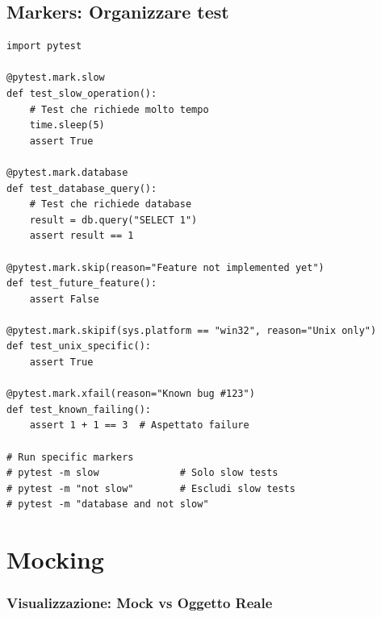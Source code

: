 \subsection{Markers: Organizzare test}

\begin{lstlisting}
import pytest

@pytest.mark.slow
def test_slow_operation():
    # Test che richiede molto tempo
    time.sleep(5)
    assert True

@pytest.mark.database
def test_database_query():
    # Test che richiede database
    result = db.query("SELECT 1")
    assert result == 1

@pytest.mark.skip(reason="Feature not implemented yet")
def test_future_feature():
    assert False

@pytest.mark.skipif(sys.platform == "win32", reason="Unix only")
def test_unix_specific():
    assert True

@pytest.mark.xfail(reason="Known bug #123")
def test_known_failing():
    assert 1 + 1 == 3  # Aspettato failure

# Run specific markers
# pytest -m slow              # Solo slow tests
# pytest -m "not slow"        # Escludi slow tests
# pytest -m "database and not slow"
\end{lstlisting}

\section{Mocking}

\subsubsection{Visualizzazione: Mock vs Oggetto Reale}

